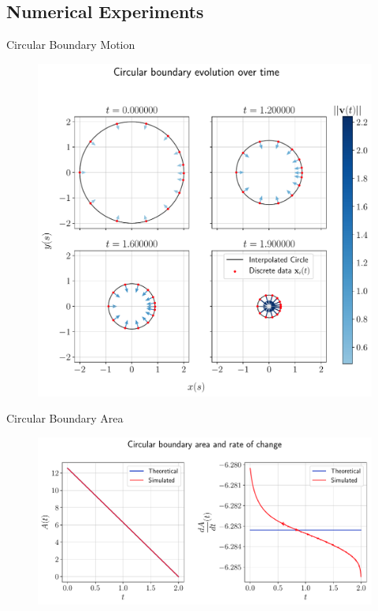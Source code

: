 \documentclass[usenames,dvipsnames]{beamer}
\begin{document}
\subsection{Numerical Experiments}
\begin{frame}{Circular Boundary Motion}
    \begin{figure}
        \centering
        \includegraphics[trim={0 0 0 6em}, clip=true, scale=0.43]{figures/closed_boundary/circularboundary.pdf}
    \end{figure}
\end{frame}

\begin{frame}{Circular Boundary Area}
    \begin{figure}
        \centering
        \includegraphics[trim={0 0 0 0}, clip=true, scale=0.43]{figures/closed_boundary/circularboundary_area.pdf}
    \end{figure}
\end{frame}
\end{document}
